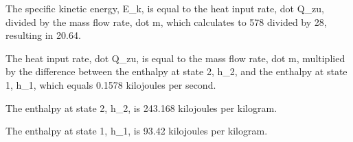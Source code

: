 The specific kinetic energy, E_k, is equal to the heat input rate, dot Q_zu, divided by the mass flow rate, dot m, which calculates to 578 divided by 28, resulting in 20.64.

The heat input rate, dot Q_zu, is equal to the mass flow rate, dot m, multiplied by the difference between the enthalpy at state 2, h_2, and the enthalpy at state 1, h_1, which equals 0.1578 kilojoules per second.

The enthalpy at state 2, h_2, is 243.168 kilojoules per kilogram.

The enthalpy at state 1, h_1, is 93.42 kilojoules per kilogram.